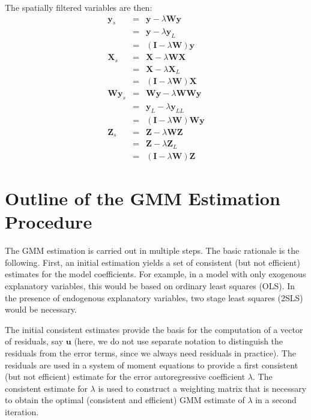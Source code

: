 \documentclass{article}
\begin{document}
The spatially filtered variables are then:
\begin{eqnarray*}
\mathbf{y}_s &=& \mathbf{y} - \lambda \mathbf{Wy}\\
                    &=& \mathbf{y} - \lambda \mathbf{y}_L\\
 &=& (\mathbf{I} - \lambda \mathbf{W}) \mathbf{y}\\
\mathbf{X}_s &=& \mathbf{X} - \lambda \mathbf{WX}\\
                    &=& \mathbf{X} - \lambda \mathbf{X}_L\\
 &=& (\mathbf{I} - \lambda \mathbf{W}) \mathbf{X}\\
 \mathbf{Wy}_s &=& \mathbf{Wy} - \lambda \mathbf{WWy}\\
                     &=& \mathbf{y}_L - \lambda \mathbf{y}_{LL}\\
 &=& (\mathbf{I} - \lambda \mathbf{W}) \mathbf{Wy}\\
\mathbf{Z}_s &=& \mathbf{Z} - \lambda \mathbf{WZ}\\
                    &=& \mathbf{Z} - \lambda \mathbf{Z}_L\\
 &=& (\mathbf{I} - \lambda \mathbf{W}) \mathbf{Z}
\end{eqnarray*}


\section{Outline of the GMM Estimation Procedure}
The GMM estimation is carried out in multiple steps. The basic rationale is the
following. First, an initial estimation yields a set of consistent (but not efficient) estimates
for the model coefficients. For example, in a model with only exogenous explanatory
variables, this would be based on ordinary least squares (OLS). In the presence of
endogenous explanatory variables, two stage least squares (2SLS) would be necessary.

The initial consistent estimates provide the basis for the computation of a vector
of residuals, say $\mathbf{u}$ (here, we do not use separate notation to distinguish the
residuals from the error terms, since we always need residuals in practice). The residuals are 
used in a system of moment equations to provide a first consistent (but not efficient) estimate
for the error autoregressive coefficient $\lambda$. The consistent estimate for $\lambda$ is used
to construct a weighting matrix that is necessary to obtain the optimal (consistent and efficient) GMM
estimate of $\lambda$ in a second iteration.
\end{document}
